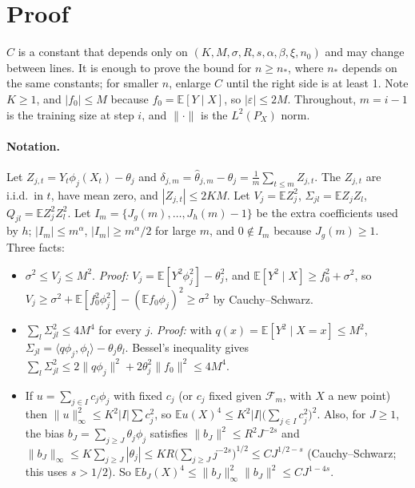 \documentclass[11pt]{article}
\newcommand{\E}{\mathbb{E}}
\begin{document}
\section{Proof}

$C$ is a constant that depends only on $(K,M,\sigma,R,s,\alpha,\beta,\xi,n_0)$ and may change between lines. It is enough to prove the bound for $n\ge n_*$, where $n_*$ depends on the same constants; for smaller $n$, enlarge $C$ until the right side is at least 1. Note $K\ge1$, and $|f_0|\le M$ because $f_0=\E[Y\mid X]$, so $|\varepsilon|\le2M$. Throughout, $m=i-1$ is the training size at step $i$, and $\|\cdot\|$ is the $L^2(P_X)$ norm.

\paragraph{Notation.} Let $Z_{j,t}=Y_t\phi_j(X_t)-\theta_j$ and $\delta_{j,m}=\hat\theta_{j,m}-\theta_j=\frac1m\sum_{t\le m}Z_{j,t}$. The $Z_{j,t}$ are i.i.d.\ in $t$, have mean zero, and $|Z_{j,t}|\le2KM$. Let $V_j=\E Z_j^2$, $\Sigma_{jl}=\E Z_jZ_l$, $Q_{jl}=\E Z_j^2Z_l^2$. Let $I_m=\{J_g(m),\dots,J_h(m)-1\}$ be the extra coefficients used by $h$; $|I_m|\le m^\alpha$, $|I_m|\ge m^\alpha/2$ for large $m$, and $0\notin I_m$ because $J_g(m)\ge1$. Three facts:
\begin{itemize}\itemsep1pt
\item[(F1)] $\sigma^2\le V_j\le M^2$. \emph{Proof:} $V_j=\E[Y^2\phi_j^2]-\theta_j^2$, and $\E[Y^2\mid X]\ge f_0^2+\sigma^2$, so $V_j\ge\sigma^2+\E[f_0^2\phi_j^2]-(\E f_0\phi_j)^2\ge\sigma^2$ by Cauchy--Schwarz.
\item[(F2)] $\sum_l\Sigma_{jl}^2\le4M^4$ for every $j$. \emph{Proof:} with $q(x)=\E[Y^2\mid X=x]\le M^2$, $\Sigma_{jl}=\langle q\phi_j,\phi_l\rangle-\theta_j\theta_l$. Bessel's inequality gives $\sum_l\Sigma_{jl}^2\le2\|q\phi_j\|^2+2\theta_j^2\|f_0\|^2\le4M^4$.
\item[(F3)] If $u=\sum_{j\in I}c_j\phi_j$ with fixed $c_j$ (or $c_j$ fixed given $\mathcal F_m$, with $X$ a new point) then $\|u\|_\infty^2\le K^2|I|\sum c_j^2$, so $\E u(X)^4\le K^2|I|\bigl(\sum_{j\in I}c_j^2\bigr)^2$. Also, for $J\ge1$, the bias $b_J=\sum_{j\ge J}\theta_j\phi_j$ satisfies $\|b_J\|^2\le R^2J^{-2s}$ and $\|b_J\|_\infty\le K\sum_{j\ge J}|\theta_j|\le KR\bigl(\sum_{j\ge J}j^{-2s}\bigr)^{1/2}\le CJ^{1/2-s}$ (Cauchy--Schwarz; this uses $s>1/2$). So $\E b_J(X)^4\le\|b_J\|_\infty^2\|b_J\|^2\le CJ^{1-4s}$.
\end{itemize}
\end{document}
